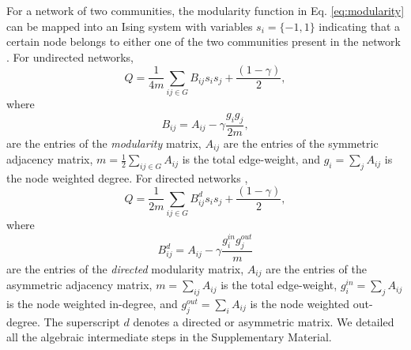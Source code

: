 \documentclass[pdflatex,sn-mathphys-num]{sn-jnl}%
\begin{document}
For a network of two communities, the modularity function in Eq. \ref{eq:modularity} can be mapped into an Ising system with variables $s_i = \{-1,1\}$ indicating that a certain node belongs to either one of the two communities present in the network \cite{Newman2006,Reichardt2006,Negre2020,Wierzbinski2023}. For undirected networks,
\begin{equation} \label{eq:mod_ising_symm}
    Q = \frac{1}{4m} \sum_{ij\in G} B_{ij} s_i s_j + \frac{(1-\gamma)}{2},
\end{equation} where
\begin{equation} \label{eq:und_mod_matrix}
    B_{ij} = A_{ij} - \gamma \frac{g_i g_j}{2m},
\end{equation} are the entries of the \textit{modularity} matrix, $A_{ij}$ are the entries of the symmetric adjacency matrix, $m = \frac{1}{2}\sum_{ij \in G}A_{ij}$ is the total edge-weight, and $g_i=\sum_j A_{ij}$ is the node weighted degree. For directed networks \cite{Leicht2008},
\begin{equation} \label{eq:mod_ising_dir}
    Q = \frac{1}{2m} \sum_{ij\in G} B_{ij}^{d} s_i s_j + \frac{(1-\gamma)}{2},
\end{equation} where 
\begin{equation} \label{eq:dir_mod_matrix}
    B_{ij}^d = A_{ij} - \gamma \frac{g_i^{in} g_j^{out}}{m}
\end{equation} are the entries of the \textit{directed} modularity matrix, $A_{ij}$ are the entries of the asymmetric adjacency matrix,  $m=\sum_{ij}A_{ij}$ is the total edge-weight, $g_i^{in}=\sum_j A_{ij}$ is the node weighted in-degree, and $g_j^{out}=\sum_i A_{ij}$ is the node weighted out-degree. The superscript $d$ denotes a directed or asymmetric matrix. We detailed all the algebraic intermediate steps in the Supplementary Material. 
\end{document}
